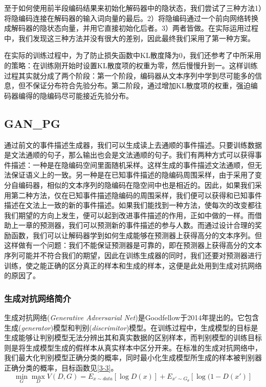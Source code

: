 \documentclass[]{template}
\begin{document}
至于如何使用前半段编码结果来初始化解码器中的隐状态，我们尝试了三种方法1）将隐编码连接在解码器的输入词向量的最后。2）将隐编码通过一个前向网络转换成解码器的隐状态向量，并用它直接初始化后者。3）两者皆做。在实际运用过程中，我们发现这三种方法并没有很大的差别，因此最终我们采用了第一种方案。

在实际的训练过程中，为了防止损失函数中KL散度降为0，我们还参考了\cite{bowman_generating_2015}中所采用的策略：在训练刚开始时设置KL散度项的权重为零，然后慢慢升到一。这样训练过程其实就分成了两个阶段：第一个阶段，编码器从文本序列中学到尽可能多的信息，但不保证分布符合先验分布。第二阶段，通过增加KL散度项的权重，强迫编码器编得的隐编码尽可能接近先验分布。

\subsection{GAN\_PG}
通过前文的事件描述生成器，我们可以生成读上去通顺的事件描述。只要训练数据是文法通顺的句子，那么输出也会是文法通顺的句子。我们有两种方式可以获得事件描述：一种是在隐编码空间里面随机采样。这样生成的事件描述文法通顺，但无法保证语义上的一致。另一种是在已知事件描述的隐编码周围采样，由于采用了变分自编码器，相似的文本序列的隐编码在隐空间中也是相近的。因此，如果我们采用第二种方法，仅在已知事件描述隐编码的周围采样，我们便可以获得和已知事件描述在文法上一致的新的事件描述。如果我们能找到一种方法，使每次的改变都往我们期望的方向上发生，便可以起到改进事件描述的作用，正如\cite{noauthor_sequence_nodate}中做的一样。而借助上一章的预测器，我们可以预测新的事件描述的参与人数。而通过设计合理的奖励函数，我们可以让解码器学到如何生成能够在预测器上获得高分的文本序列。但这样做有一个问题：我们不能保证预测器是可靠的，即在预测器上获得高分的文本序列可能并不符合我们的期望，因此在训练生成器的同时，我们还要对预测器进行训练，使之能正确的区分真正的样本和生成的样本，这便是此处用到生成对抗网络的原因了。
\subsubsection{生成对抗网络简介}
生成对抗网络(\textit{Generative Adversarial Net}\cite{goodfellow_generative_2014})是Goodfellow于2014年提出的。它包含生成(\textit{generator})模型和判别(\textit{discrimitor})模型。在训练过程中，生成模型的目标是生成能够让判别模型无法分辨出其和真实数据的区别样本，而判别模型的训练目标则是将生成模型生成的假样本从真实样本中区分开来。在标准的生成对抗网络中，我们最大化判别模型正确分类的概率，同时最小化生成模型所生成的样本被判别器正确分类的概率，目标函数见\ref{3-3}。
\begin{equation}\label{3-3}
    \mathop{min}_G \mathop{max}_D V(D,G)=E_{x\sim data}[\log D(x)]+E_{x'\sim G_\theta}[\log(1-D(x')]
\end{equation}
\end{document}
